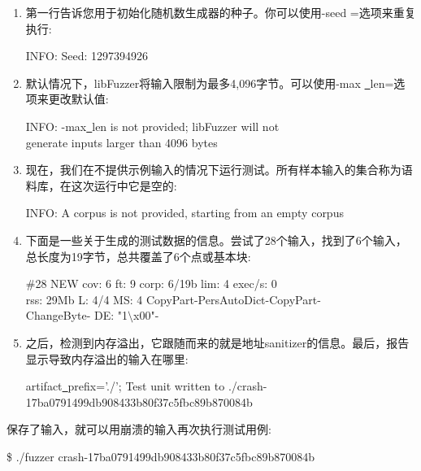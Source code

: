 \begin{enumerate}
\item 第一行告诉您用于初始化随机数生成器的种子。你可以使用-seed =选项来重复执行:
\begin{tcolorbox}[colback=white,colframe=black]
INFO: Seed: 1297394926
\end{tcolorbox}

\item 默认情况下，libFuzzer将输入限制为最多4,096字节。可以使用-max \underline{~}len=选项来更改默认值:
\begin{tcolorbox}[colback=white,colframe=black]
INFO: -max\underline{~}len is not provided; libFuzzer will not \\
generate inputs larger than 4096 bytes
\end{tcolorbox}

\item 现在，我们在不提供示例输入的情况下运行测试。所有样本输入的集合称为语料库，在这次运行中它是空的:
\begin{tcolorbox}[colback=white,colframe=black]
INFO: A corpus is not provided, starting from an empty corpus
\end{tcolorbox}

\item 下面是一些关于生成的测试数据的信息。尝试了28个输入，找到了6个输入，总长度为19字节，总共覆盖了6个点或基本块:
\begin{tcolorbox}[colback=white,colframe=black]
\#28 NEW cov: 6 ft: 9 corp: 6/19b lim: 4 exec/s: 0 \\
rss: 29Mb L: 4/4 MS: 4 CopyPart-PersAutoDict-CopyPart- \\
ChangeByte- DE: "1$\setminus$x00"-
\end{tcolorbox}

\item 之后，检测到内存溢出，它跟随而来的就是地址sanitizer的信息。最后，报告显示导致内存溢出的输入在哪里:
\begin{tcolorbox}[colback=white,colframe=black]
artifact\underline{~}prefix='./'; Test unit written to ./crash-17ba0791499db908433b80f37c5fbc89b87\allowbreak 0084b
\end{tcolorbox}

\end{enumerate}

保存了输入，就可以用崩溃的输入再次执行测试用例:\par

\begin{tcolorbox}[colback=white,colframe=black]
\$ ./fuzzer crash-17ba0791499db908433b80f37c5fbc89b870084b
\end{tcolorbox}


